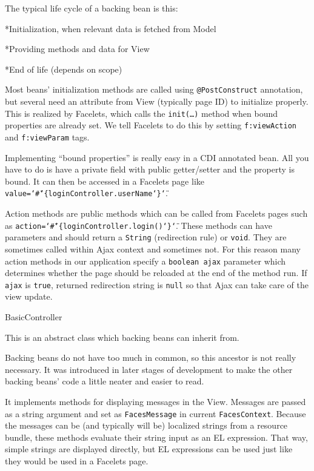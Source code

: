 The typical life cycle of a backing bean is this:

\begitems

*Initialization, when relevant data is fetched from Model

*Providing methods and data for View

*End of life (depends on scope)

\enditems

Most beans’ initialization methods are called using {\tt @PostConstruct} annotation, but several need an attribute from View (typically page ID) to initialize properly. This is realized by Facelets, which calls the {\tt init(…)} method when bound properties are already set. We tell Facelets to do this by setting {\tt f:viewAction} and {\tt f:viewParam} tags.

Implementing “bound properties” is really easy in a CDI annotated bean. All you have to do is have a private field with public getter/setter and the property is bound. It can then be accessed in a Facelets page like {\tt value=\char`\"\#\char`\{loginController.userName\char`\}\char`\"}.

Action methods are public methods which can be called from Facelets pages such as {\tt action=\char`\"\#\char`\{loginController.login()\char`\}\char`\"}. These methods can have parameters and should return a {\tt String} (redirection rule) or {\tt void}. They are sometimes called within Ajax context and sometimes not. For this reason many action methods in our application specify a {\tt boolean ajax} parameter which determines whether the page should be reloaded at the end of the method run. If {\tt ajax} is {\tt true}, returned redirection string is {\tt null} so that Ajax can take care of the view update.

\secc BasicController

This is an abstract class which backing beans can inherit from.

Backing beans do not have too much in common, so this ancestor is not really necessary. It was introduced in later stages of development to make the other backing beans’ code a little neater and easier to read.

It implements methods for displaying messages in the View. Messages are passed as a string argument and set as {\tt FacesMessage} in current {\tt FacesContext}. Because the messages can be (and typically will be) localized strings from a resource bundle, these methods evaluate their string input as an EL expression. That way, simple strings are displayed directly, but EL expressions can be used just like they would be used in a Facelets page.

